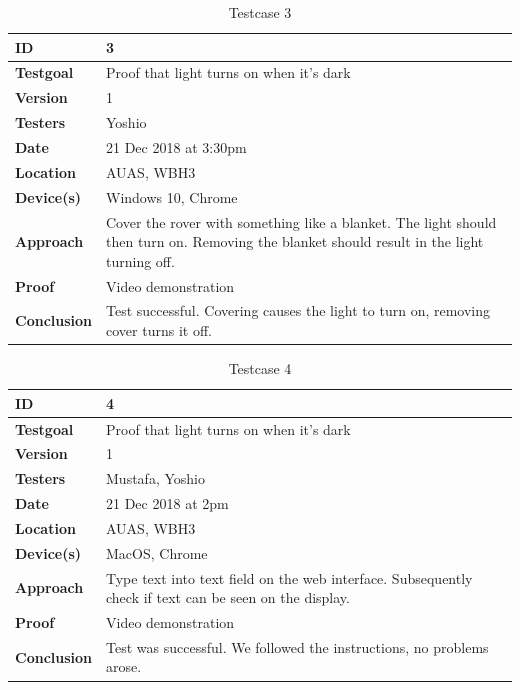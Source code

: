\documentclass[12pt]{article}
\begin{document}
 	\begin{table}[H]
 		\centering
 		\begin{tabularx}{\linewidth}{|X|X|}
 			\hline
 			\textbf{ID} &3\\
 			\hline
 			\textbf{Testgoal} &Proof that light turns on when it's dark\\
 			\hline
 			\textbf{Version} &1\\
 			\hline
 			\textbf{Testers} &Yoshio\\
 			\hline
 			\textbf{Date} &21 Dec 2018 at 3:30pm\\
 			\hline
 			\textbf{Location} &AUAS, WBH3\\
 			\hline
 			\textbf{Device(s)} &Windows 10, Chrome\\
 			\hline
 			\textbf{Approach} &Cover the rover with something like a blanket. The light should then turn on. Removing the blanket should result in the light turning off.\\
 			\hline
 			\textbf{Proof} &Video demonstration\\
 			\hline
 			\textbf{Conclusion} &Test successful. Covering causes the light to turn on, removing cover turns it off.\\
 			\hline
 		\end{tabularx}
 		\caption{Testcase 3}
 		\label{table:Testcase 3}   
 	\end{table}
 	\begin{table}[H]
 	\centering
	 	\begin{tabularx}{\linewidth}{|X|X|}
	 		\hline
	 		\textbf{ID} &4\\
	 		\hline
	 		\textbf{Testgoal} &Proof that light turns on when it's dark\\
	 		\hline
	 		\textbf{Version} &1\\
	 		\hline
	 		\textbf{Testers} &Mustafa, Yoshio\\
	 		\hline
	 		\textbf{Date} &21 Dec 2018 at 2pm\\
	 		\hline
	 		\textbf{Location} &AUAS, WBH3\\
	 		\hline
	 		\textbf{Device(s)} &MacOS, Chrome\\
	 		\hline
	 		\textbf{Approach} &Type text into text field on the web interface. Subsequently check if text can be seen on the display.\\
	 		\hline
	 		\textbf{Proof} &Video demonstration\\
	 		\hline
	 		\textbf{Conclusion} &Test was successful. We followed the instructions, no problems arose.\\
	 		\hline
	 	\end{tabularx}
 	\caption{Testcase 4}
 	\label{table:Testcase 4}   
	\end{table}
\end{document}
